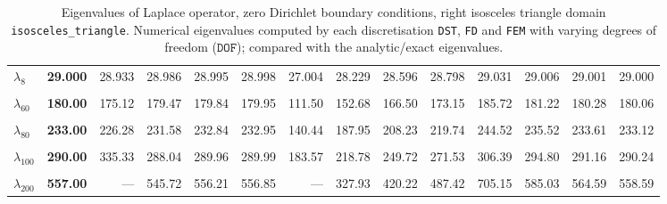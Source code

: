 \begin{table}[htbp]
{{\begin{tabular}{lrrrrrrrrrrrrr}
    $\lambda_{8}$ & \textbf{29.000} & 28.933 & 28.986 & 28.995 & 28.998 & 27.004 & 28.229 & 28.596 & 28.798 & 29.031 & 29.006 & 29.001 & 29.000 \\
    & & & & & & & & & & & & & \\
    $\lambda_{60}$ & \textbf{180.00} & 175.12 & 179.47 & 179.84 & 179.95 & 111.50 & 152.68 & 166.50 & 173.15 & 185.72 & 181.22 & 180.28 & 180.06 \\
    & & & & & & & & & & & & & \\
    $\lambda_{80}$ & \textbf{233.00} & 226.28 & 231.58 & 232.84 & 232.95 & 140.44 & 187.95 & 208.23 & 219.74 & 244.52 & 235.52 & 233.61 & 233.12 \\
    & & & & & & & & & & & & & \\
    $\lambda_{100}$ & \textbf{290.00} & 335.33 & 288.04 & 289.96 & 289.99 & 183.57 & 218.78 & 249.72 & 271.53 & 306.39 & 294.80 & 291.16 & 290.24 \\
    & & & & & & & & & & & & & \\
    $\lambda_{200}$ & \textbf{557.00} & --- & 545.72 & 556.21 & 556.85 & --- & 327.93 & 420.22 & 487.42 & 705.15 & 585.03 & 564.59 & 558.59 \\
    \bottomrule
  \end{tabular}}}
  \caption{Eigenvalues of Laplace operator, zero Dirichlet boundary conditions, right isosceles triangle domain \texttt{isosceles\_triangle}. Numerical eigenvalues computed by each discretisation \texttt{DST}, \texttt{FD} and \texttt{FEM} with varying degrees of freedom ($\mathtt{DOF}$); compared with the analytic/exact eigenvalues.}
  \label{tab:eigenvalues_head_isosceles_triangle_transposed_extended}
\end{table}
